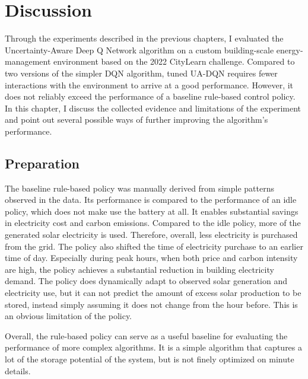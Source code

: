 
\chapter{Discussion}
  \label{Discussion}

Through the experiments described in the previous chapters, I evaluated the Uncertainty-Aware Deep Q Network algorithm on a custom building-scale energy-management environment based on the 2022 CityLearn challenge.
Compared to two versions of the simpler DQN algorithm, tuned UA-DQN requires fewer interactions with the environment to arrive at a good performance.
However, it does not reliably exceed the performance of a baseline rule-based control policy.
In this chapter, I discuss the collected evidence and limitations of the experiment and point out several possible ways of further improving the algorithm's performance.

\section{Preparation}
The baseline rule-based policy was manually derived from simple patterns observed in the data.
Its performance is compared to the performance of an idle policy, which does not make use the battery at all.
It enables substantial savings in electricity cost and carbon emissions.
Compared to the idle policy, more of the generated solar electricity is used.
Therefore, overall, less electricity is purchased from the grid.
The policy also shifted the time of electricity purchase to an earlier time of day.
Especially during peak hours, when both price and carbon intensity are high, the policy achieves a substantial reduction in building electricity demand.
The policy does dynamically adapt to observed solar generation and electricity use, but it can not predict the amount of excess solar production to be stored, instead simply assuming it does not change from the hour before.
This is an obvious limitation of the policy.

Overall, the rule-based policy can serve as a useful baseline for evaluating the performance of more complex algorithms.
It is a simple algorithm that captures a lot of the storage potential of the system, but is not finely optimized on minute details.

